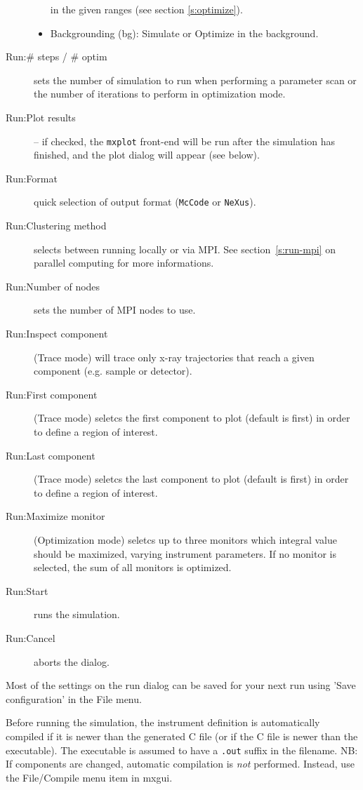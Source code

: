 \begin{description}
\begin{itemize}
    in the given ranges (see section \ref{s:optimize}).
  \item Backgrounding (bg): Simulate or Optimize in the background.
\end{itemize}
\item[Run:\# steps / \# optim] sets the number of simulation to run when
  performing a parameter scan or the number of iterations to
  perform in optimization mode.
\item[Run:Plot results] -- if checked, the \verb+mxplot+ front-end will be run
  after the simulation has finished, and the plot dialog will appear
  (see below).
\item[Run:Format] quick selection of output format (\texttt{McCode} or
  \texttt{NeXus}).
\item[Run:Clustering method] selects between running locally or via MPI.
  See section~\ref{s:run-mpi} on parallel computing for
  more informations.
\item[Run:Number of nodes] sets the number of MPI nodes to use.
\item[Run:Inspect component] (Trace mode) will trace only x-ray trajectories
  that reach a given component (e.g. sample or detector).
\item[Run:First component] (Trace mode) seletcs the first component to plot
  (default is first) in order to define a region of interest.
\item[Run:Last component] (Trace mode) seletcs the last component to plot
  (default is first) in order to define a region of interest.
\item[Run:Maximize monitor] (Optimization mode) seletcs up to three monitors
  which integral value should be maximized, varying instrument parameters. If no
  monitor is selected, the sum of all monitors is optimized.
\item[Run:Start] runs the simulation.
\item[Run:Cancel] aborts the dialog.
\end{description}
Most of the settings on the run dialog can be saved for your next
\MCX run using 'Save configuration' in the File menu.

Before running the simulation, the instrument definition is automatically
compiled if it is newer than the generated C file (or if the C file is newer
than the executable). The executable is assumed to have a \verb+.out+ suffix in
the filename. NB: If components are changed, automatic compilation is \emph{not}
performed. Instead, use the File/Compile menu item in mxgui.



